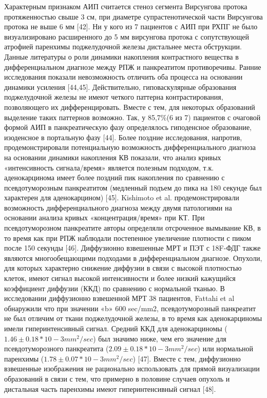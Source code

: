 Характерным признаком АИП считается стеноз сегмента Вирсунгова протока протяженностью свыше 3 см, при диаметре супрастенотической части Вирсунгова протока не выше 6 мм [42]. Ни у кого из 7 пациентов с АИП при РХПГ не было визуализировано расширенного до 5 мм вирсунгова протока с сопутствующей атрофией паренхимы поджелудочной железы дистальнее места обструкции. 
Данные литературы о роли динамики накопления контрастного вещества в дифференциальном диагнозе между РПЖ и панкреатитом противоречивы. Ранние исследования показали невозможность отличить оба процесса на основании динамики усиления [44,45]. Действительно, гиповаскулярные образования поджелудочной железы не имеют четкого паттерна контрастирования, позволяющего их дифференцировать. Вместе с тем, для некоторых образований выделение таких паттернов возможно. Так, у 85,7\%(6 из 7) пациентов с очаговой формой АИП в панкреатическую фазу определялось гиподенсное образование, изоденсное в портальную фазу [44].
Более поздние исследования, напротив, продемонстрировали потенциальную возможность дифференциального диагноза на основании динамики накопления КВ показали, что анализ кривых «интенсивность сигнала/время» является полезным подходом, т.к. аденокарцинома имеет более поздний пик накопления по сравнению с псевдотуморозным панкреатитом (медленный подъем до пика на 180 секунде был характерен для аденокарцином) [45]. Kishimoto et al. продемонстрировали возможность дифференциального диагноза между двумя патологиями на основании анализа кривых «концентрация/время» при КТ. При псевдотуморозном панкреатите авторы определяли отсроченное вымывание КВ, в то время как при РПЖ наблюдали постепенное увеличение плотности с пиком после 150 секунды [46].
Диффузионно взвешенные МРТ и ПЭТ с 18F-ФДГ также являются многообещающими подходами в дифференциальном диагнозе. Опухоли, для которых характерно снижение диффузии в связи с высокой плотностью клеток, имеют сигнал высокой интенсивности и более низкий кажущийся коэффициент диффузии (ККД) по сравнению с нормальной тканью. В исследовании диффузионно взвешенной МРТ 38 пациентов, Fattahi et al обнаружили что при значении «b» 600 sec/mm2, псевдотуморозный панкреатит не был отличим от ткани поджелудочной железы, в то время как аденокарциномы имели гиперинтенсивный сигнал. Средний ККД для аденокарциномы ($1.46\pm0.18 *10-3 mm^2/sec$) был значимо ниже, чем его значение для псевдотуморозного панкреатита ($2.09\pm0.18* 10-3 mm^2/sec$) или нормальной паренхимы ($1.78\pm0.07 * 10-3 mm^2/sec$) [47].
Вместе с тем, диффузионно взвешенные изображения не рационально использовать для прямой визуализации образований в связи с тем, что примерно в половине случаев опухоль и дистальная часть паренхимы имеют гиперинтенсивный сигнал [48].
